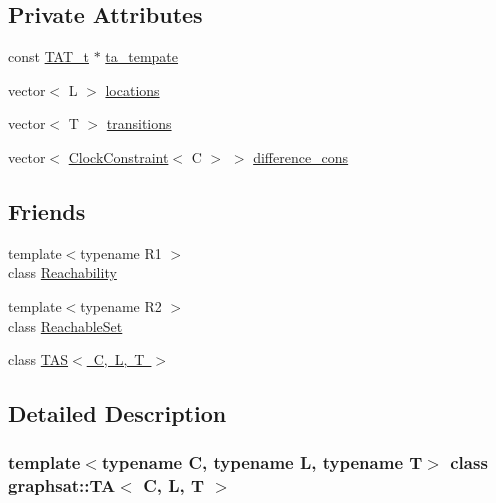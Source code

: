 \subsection*{Private Attributes}
\begin{DoxyCompactItemize}
\item 
const \mbox{\hyperlink{classgraphsat_1_1_t_a_a9d81348f6a488c20a885e5eed6cd8a14}{T\+A\+T\+\_\+t}} $\ast$ \mbox{\hyperlink{classgraphsat_1_1_t_a_a70a95125e666079a25f808fe99ca6fe0}{ta\+\_\+tempate}}
\item 
vector$<$ L $>$ \mbox{\hyperlink{classgraphsat_1_1_t_a_a0b4b46f5854b0e35b741fd7e82df4046}{locations}}
\item 
vector$<$ T $>$ \mbox{\hyperlink{classgraphsat_1_1_t_a_a2525c9f51319ca318285566c52e6b9d1}{transitions}}
\item 
vector$<$ \mbox{\hyperlink{classgraphsat_1_1_clock_constraint}{Clock\+Constraint}}$<$ C $>$ $>$ \mbox{\hyperlink{classgraphsat_1_1_t_a_a8a0eaf0b7ee5ffee7f4cdc95b7ad7f2f}{difference\+\_\+cons}}
\end{DoxyCompactItemize}
\subsection*{Friends}
\begin{DoxyCompactItemize}
\item 
{\footnotesize template$<$typename R1 $>$ }\\class \mbox{\hyperlink{classgraphsat_1_1_t_a_ac274586d6140dff44fa1029371c2cf48}{Reachability}}
\item 
{\footnotesize template$<$typename R2 $>$ }\\class \mbox{\hyperlink{classgraphsat_1_1_t_a_a8e8eb523736892bc0c9b460e370db614}{Reachable\+Set}}
\item 
class \mbox{\hyperlink{classgraphsat_1_1_t_a_af6e6d1ed1c059a7b2b5e7bd542ea8d83}{T\+A\+S$<$ C, L, T $>$}}
\end{DoxyCompactItemize}


\subsection{Detailed Description}
\subsubsection*{template$<$typename C, typename L, typename T$>$\newline
class graphsat\+::\+T\+A$<$ C, L, T $>$}

